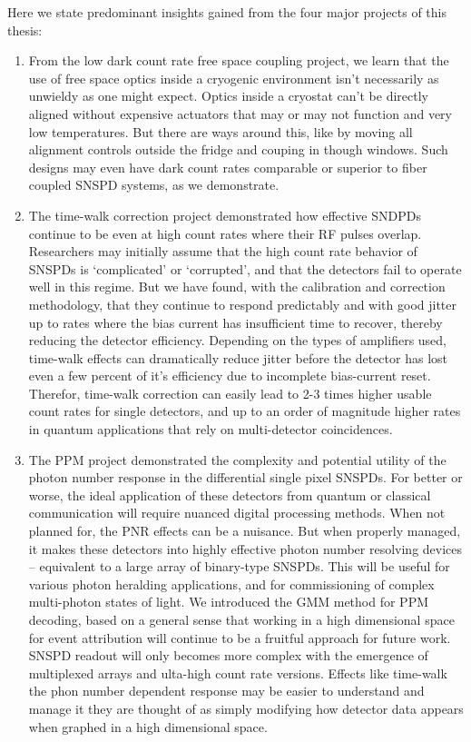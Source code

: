 \documentclass[11pt]{caltech_thesis} %
\begin{document}
Here we state predominant insights gained from the four major projects of this thesis:

\begin{enumerate}
\def\labelenumi{\arabic{enumi}.}
\item
  From the low dark count rate free space coupling project, we learn that the use of free space optics inside a cryogenic environment isn't necessarily as unwieldy as one might expect. Optics inside a cryostat can't be directly aligned without expensive actuators that may or may not function and very low temperatures. But there are ways around this, like by moving all alignment controls outside the fridge and couping in though windows. Such designs may even have dark count rates comparable or superior to fiber coupled SNSPD systems, as we demonstrate.
\item
  The time-walk correction project demonstrated how effective SNDPDs continue to be even at high count rates where their RF pulses overlap. Researchers may initially assume that the high count rate behavior of SNSPDs is `complicated' or `corrupted', and that the detectors fail to operate well in this regime. But we have found, with the calibration and correction methodology, that they continue to respond predictably and with good jitter up to rates where the bias current has insufficient time to recover, thereby reducing the detector efficiency. Depending on the types of amplifiers used, time-walk effects can dramatically reduce jitter before the detector has lost even a few percent of it's efficiency due to incomplete bias-current reset. Therefor, time-walk correction can easily lead to 2-3 times higher usable count rates for single detectors, and up to an order of magnitude higher rates in quantum applications that rely on multi-detector coincidences.
\item
  The PPM project demonstrated the complexity and potential utility of the photon number response in the differential single pixel SNSPDs. For better or worse, the ideal application of these detectors from quantum or classical communication will require nuanced digital processing methods. When not planned for, the PNR effects can be a nuisance. But when properly managed, it makes these detectors into highly effective photon number resolving devices -- equivalent to a large array of binary-type SNSPDs. This will be useful for various photon heralding applications, and for commissioning of complex multi-photon states of light. We introduced the GMM method for PPM decoding, based on a general sense that working in a high dimensional space for event attribution will continue to be a fruitful approach for future work. SNSPD readout will only becomes more complex with the emergence of multiplexed arrays and ulta-high count rate versions. Effects like time-walk the phon number dependent response may be easier to understand and manage it they are thought of as simply modifying how detector data appears when graphed in a high dimensional space.

\end{enumerate}
\end{document}
